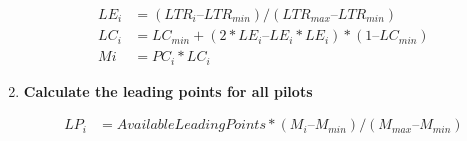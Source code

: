 \documentclass[gap.tex]{subfiles}
\begin{document}
\begin{enumerate}
        \begin{align*}
            LE_i &= (LTR_i – LTR_{min}) / (LTR_{max} – LTR_{min}) \\
            LC_i &= LC_{min} + (2*LE_i – LE_i * LE_i) * (1 – LC_{min}) \\
            Mi &= PC_i * LC_i
        \end{align*}
            
    \item \textbf{Calculate the leading points for all pilots}
        
        \begin{align*}
            LP_i &= AvailableLeadingPoints * (M_i – M_{min}) / (M_{max} – M_{min} )
        \end{align*}
\end{enumerate}
\end{document}
